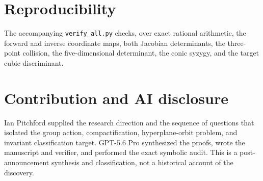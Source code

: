 \documentclass[11pt]{article}
\theoremstyle{remark}
\begin{document}
\section*{Reproducibility}

The accompanying \texttt{verify\_all.py} checks, over exact rational arithmetic,
the forward and inverse coordinate maps, both Jacobian determinants, the
three-point collision, the five-dimensional determinant, the conic syzygy, and
the target cubic discriminant.

\section*{Contribution and AI disclosure}

Ian Pitchford supplied the research direction and the sequence of questions
that isolated the group action, compactification, hyperplane-orbit problem, and
invariant classification target. GPT-5.6 Pro synthesized the proofs, wrote the
manuscript and verifier, and performed the exact symbolic audit. This is a
post-announcement synthesis and classification, not a historical account of
the discovery.
\end{document}
